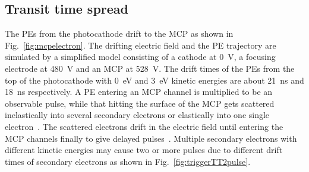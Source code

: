 \subsection{Transit time spread}
The PEs from the photocathode drift to the MCP as shown in Fig.~\ref{fig:mcpelectron}. The drifting electric field and the PE trajectory are simulated by a simplified model consisting of a cathode at \SI{0}{V}, a focusing electrode at \SI{480}{V} and an MCP at \SI{528}{V}. The drift times of the PEs from the top of the photocathode with \SI{0}{eV} and \SI{3}{eV} kinetic energies are about \SI{21}{ns} and \SI{18}{ns} respectively. A PE entering an MCP channel is multiplied to be an observable pulse, while that hitting the surface of the MCP gets scattered inelastically into several secondary electrons or elastically into one single electron~\cite{Furman}. The scattered electrons drift in the electric field until entering the MCP channels finally to give delayed pulses~\cite{KM3NetTesting}. Multiple secondary electrons with different kinetic energies may cause two or more pulses due to different drift times of secondary electrons as shown in Fig.~\ref{fig:triggerTT2pulse}.

